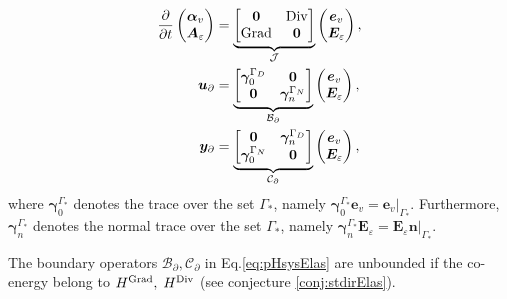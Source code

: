 \begin{equation}\label{eq:pHsysElas}
\begin{aligned}
\displaystyle
\diffp{}{t}
\begin{pmatrix}
\bm{\alpha}_v \\
\bm{A}_\varepsilon
\end{pmatrix} &= \underbrace{
\begin{bmatrix}
\bm{0} & \Div \\
\Grad & \bm{0} \\
\end{bmatrix}}_{\mathcal{J}}
\begin{pmatrix}
\bm{e}_v \\
\bm{E}_\varepsilon
\end{pmatrix}, \vspace{3pt}\\
\bm{u}_\partial &= \underbrace{
	\begin{bmatrix}
	\bm\gamma_{0}^{\Gamma_D} & \bm{0} \\
	\bm{0} & \bm\gamma_n^{\Gamma_N} \\
	\end{bmatrix}}_{\mathcal{B}_\partial} \begin{pmatrix}
\bm{e}_v \\
\bm{E}_\varepsilon
\end{pmatrix}, \vspace{3pt}\\
\bm{y}_\partial &= \underbrace{
\begin{bmatrix}
\bm{0} & \bm\gamma_{n}^{\Gamma_D} \\
\bm\gamma_0^{\Gamma_N} & \bm{0} \\
\end{bmatrix}}_{\mathcal{C}_\partial}
\begin{pmatrix}
\bm{e}_v \\
\bm{E}_\varepsilon
\end{pmatrix},
\end{aligned}
\end{equation}
where $\bm\gamma_{0}^{\Gamma_*}$ denotes the trace over the set $\Gamma_*$, namely $\bm\gamma_{0}^{\Gamma_*}\bm{e}_v = \bm{e}_v\vert_{\Gamma_*}$. Furthermore, $\bm\gamma_{n}^{\Gamma_*}$ denotes the normal trace over the set $\Gamma_*$, namely $\bm\gamma_{n}^{\Gamma_*}\bm{E}_\varepsilon = \bm{E}_\varepsilon \bm{n}\vert_{\Gamma_*}$.

\begin{remark}\label{rmk:unboundednessBC}
	The boundary operators $\mathcal{B}_\partial, \mathcal{C}_\partial$ in Eq.\eqref{eq:pHsysElas} are unbounded if the co-energy belong to $H^{\operatorname*{Grad}}, \; H^{\operatorname*{Div}}$ (see conjecture \ref{conj:stdirElas}).
\end{remark}

